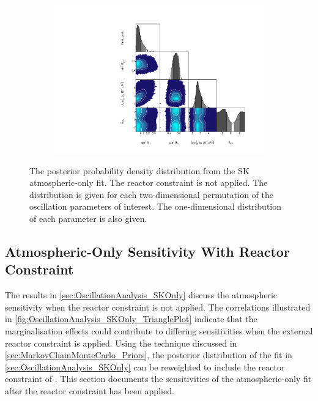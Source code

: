 \begin{figure}[h]
  \begin{subfigure}[t]{0.98\textwidth}
    \includegraphics[width=\textwidth, trim={0mm 0mm 0mm 0mm}, clip,page=1]{Figures/OA/SKOnlyFit/Contours_1D_woRC_UnSmeared_CredibleInterval_TrianglePlot.pdf}
  \end{subfigure}
  \caption{The posterior probability density distribution from the SK atmospheric-only fit. The reactor constraint is not applied. The distribution is given for each two-dimensional permutation of the oscillation parameters of interest. The one-dimensional distribution of each parameter is also given.}
  \label{fig:OscillationAnalysis_SKOnly_TrianglePlot}
\end{figure}

\clearpage
\subsection{Atmospheric-Only Sensitivity With Reactor Constraint}
\label{sec:OscillationAnalysis_SKOnly_wRC}

The results in \autoref{sec:OscillationAnalysis_SKOnly} discuss the atmospheric sensitivity when the reactor constraint is not applied. The correlations illustrated in \autoref{fig:OscillationAnalysis_SKOnly_TrianglePlot} indicate that the marginalisation effects could contribute to differing sensitivities when the external reactor constraint is applied. Using the technique discussed in \autoref{sec:MarkovChainMonteCarlo_Priors}, the posterior distribution of the fit in \autoref{sec:OscillationAnalysis_SKOnly} can be reweighted to include the reactor constraint of  \cite{Particle_Data_Group2020-ms}. This section documents the sensitivities of the atmospheric-only fit after the reactor constraint has been applied.

